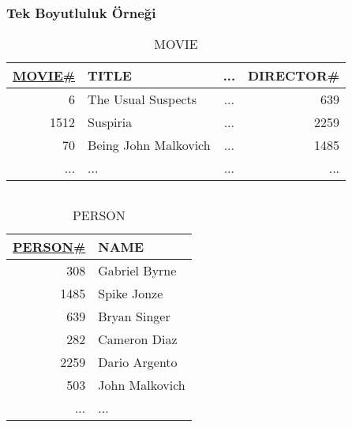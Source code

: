 \documentclass[dvipsnames]{beamer}
\theoremstyle{plain}
\begin{document}
\begin{frame}
  \frametitle{Tek Boyutluluk Örneği}

  \vspace{-12pt}
  \begin{footnotesize}
  \begin{table}
    \caption{MOVIE}
    \begin{tabular}{|r|l|c|r|}\hline
\underline{MOVIE\#} & TITLE                & ... & DIRECTOR\#\\[2pt]\hline\hline
                  6 & The Usual Suspects   & ... &        639\\\hline
               1512 & Suspiria             & ... &       2259\\\hline
                 70 & Being John Malkovich & ... &       1485\\\hline
                ... & ...                  & ... &        ...\\\hline
    \end{tabular}
  \end{table}
  \end{footnotesize}

  \vspace{-24pt}
  \begin{columns}[t]
    \begin{footnotesize}
    \begin{table}
      \caption{PERSON}
      \begin{tabular}{|r|l|}\hline
\underline{PERSON\#} & NAME          \\[2pt]\hline\hline
                 308 & Gabriel Byrne \\\hline
                1485 & Spike Jonze   \\\hline
                 639 & Bryan Singer  \\\hline
                 282 & Cameron Diaz  \\\hline
                2259 & Dario Argento \\\hline
                 503 & John Malkovich\\\hline
                 ... & ...           \\\hline
      \end{tabular}
    \end{table}
    \end{footnotesize}


\end{columns}
\end{frame}
\end{document}
